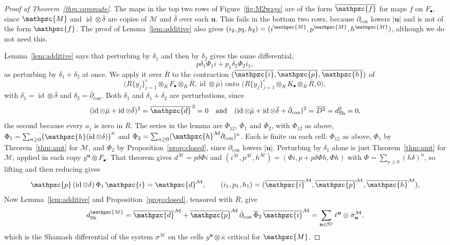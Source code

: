 \documentclass[12pt]{amsart}
\theoremstyle{plain}
\theoremstyle{definition}
\newcommand{\dcon}{\partial_{\mathrm{con}}}
\newcommand{\F}{ {F_\bullet} }
\newcommand{\Rbar}{\overline{R}}
\newcommand{\M}{\mathcal{M}}
\newcommand{\lift}[1]{\mathpzc{#1}}
\newcommand{\id}{\operatorname{id}}
\newcommand{\N}{\mathbb{N}}
\newcommand{\Sh}{\mathrm{Sh}}
\begin{document}
\begin{proof}[Proof of Theorem~\ref{thm:commute}]
    The maps in the top two rows of Figure~\ref{fig:M2ways} are of the form $\overline{\lift{f}}$ for maps $f$ on $\F$, since $\lift{M}$ and $\id \otimes \bar\delta$ are copies of $\M$ and $\bar\delta$ over each $\boldsymbol{u}$. This fails in the bottom two rows, because $\dcon$ lowers $|\boldsymbol{u}|$ and is not of the form $\lift{f}$. The proof of Lemma~\ref{lem:additive} also gives $(i_2, p_2, h_2) = (i^{\lift{M}}, p^{\lift{M}}, h^{\lift{M}})$, although we do not need this.

    Lemma~\ref{lem:additive} says that perturbing by $\delta_1$ and then by $\delta_2$ gives the same differential, $$p \delta_1 \Phi_1 i + p_1 \delta_2 \Phi_2 i_1,$$ as perturbing by $\delta_1 + \delta_2$ at once. We apply it over $\Rbar$ to the contraction $(\overline{\lift{i}}, \overline{\lift{p}}, \overline{\lift{h}})$ of $$\bigl(R\{y_j\}_{j=1}^{c} \otimes_R \F \otimes_R \Rbar, \id \otimes \bar\mu\bigr) \text{ onto } \bigl(R\{y_j\}_{j=1}^{c} \otimes_R K_\bullet \otimes_R \Rbar, 0\bigr),$$ with $\delta_1 = \id \otimes \bar\delta$ and $\delta_2 = \bar\partial_{\mathrm{con}}$. Both $\delta_1$ and $\delta_1 + \delta_2$ are perturbations, since
    \[
        (\id \otimes \bar\mu + \id \otimes \bar\delta)^2 = \overline{\lift{d}}^{\,2} = 0 \quad \text{and} \quad (\id \otimes \bar\mu + \id \otimes \bar\delta + \bar\partial_{\mathrm{con}})^2 = \overline{D^2} = d_{\Sh}^2 = 0 ,
    \]
    the second because every $a_j$ is zero in $\Rbar$. The series in the lemma are $\overline{\Phi}_{12}$, $\overline{\Phi}_1$ and $\overline{\Phi}_2$, with $\Phi_{12}$ as above, $\Phi_1 = \sum_{n \ge 0} \bigl(\lift{h} (\id \otimes \delta)\bigr)^n$ and $\Phi_2 = \sum_{n \ge 0} (\lift{h}^{\M} \dcon)^n$. Each is finite on each cell: $\Phi_{12}$ as above, $\Phi_1$ by Theorem~\ref{thm:amt} for $\M$, and $\Phi_2$
    by Proposition~\ref{prop:closed}, since $\dcon$ lowers $|\boldsymbol{u}|$. Perturbing by $\delta_1$ alone is just Theorem~\ref{thm:amt} for $\M$, applied in each copy $y^{\boldsymbol{u}} \otimes \F$. That theorem gives $d^{\M} = p \delta \Phi i$ and $(i^{\M}, p^{\M}, h^{\M}) = (\Phi i, p + p \delta \Phi h, \Phi h)$ with $\Phi = \sum_{n \ge 0}(h\delta)^n$, so lifting and then reducing gives
    \[
        \lift{p} \, (\id \otimes \delta) \, \Phi_1 \, \lift{i} = \lift{d}^{\M}, \qquad
        (i_1, p_1, h_1) = (\overline{\lift{i}}^{\M}, \overline{\lift{p}}^{\M}, \overline{\lift{h}}^{\M}) ,
    \]
    Now Lemma~\ref{lem:additive} and Proposition~\ref{prop:closed}, tensored with $\Rbar$,
    give
    \[
        d_{\Sh}^{\lift{M}} = \overline{\lift{d}}^{\M} + \overline{\lift{p}}^{\M} \, \bar\partial_{\mathrm{con}} \, \overline{\Phi}_2 \, \overline{\lift{i}}^{\M}
        = \sum_{\boldsymbol{u} \in \N^c} t^{\boldsymbol{u}} \otimes \bar\sigma^{\M}_{\boldsymbol{u}} ,
    \]
    which is the Shamash differential of the system $\sigma^{\M}$ on the cells $y^{\boldsymbol{u}} \otimes \bar\kappa$ critical for $\lift{M}$.


\end{proof}
\end{document}
